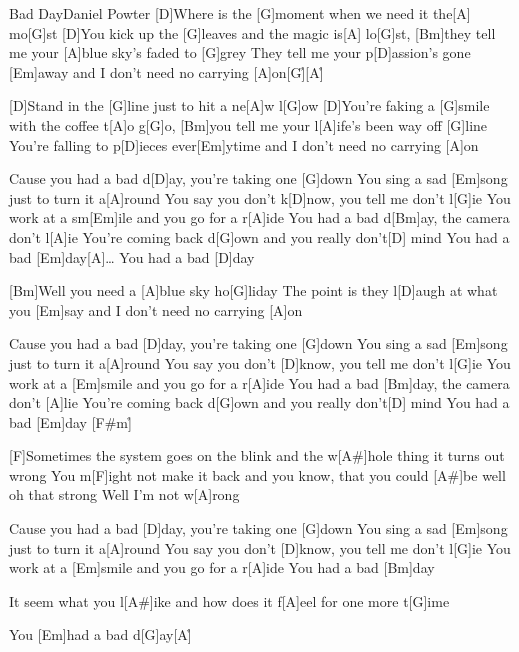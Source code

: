 \documentclass[../main.tex]{subfiles}
\begin{document}
\begin{song}[1]{Bad Day}{Daniel Powter}{}       
[D]Where is the [G]moment when we need it the[A] mo[G]st
[D]You kick up the [G]leaves and the magic is[A] lo[G]st, [Bm]they tell me your [A]blue sky's faded to [G]grey
They tell me your p[D]assion's gone [Em]away and I don't need no carrying [A]on[G]{\h}[A]{\h}

[D]Stand in the [G]line just to hit a ne[A]w l[G]ow
[D]You're faking a [G]smile with the coffee t[A]o g[G]o, [Bm]you tell me your l[A]ife's been way off [G]line
You're falling to p[D]ieces ever[Em]ytime and I don't need no carrying [A]on

Cause you had a bad d[D]ay, you're taking one [G]down
You sing a sad [Em]song just to turn it a[A]round
You say you don't k[D]now, you tell me don't l[G]ie
You work at a sm[Em]ile and you go for a r[A]ide
You had a bad d[Bm]ay, the camera don't l[A]ie
You're coming back d[G]own and you really don't[D] mind
You had a bad [Em]day[A]{…} You had a bad [D]day

[Bm]Well you need a [A]blue sky ho[G]liday
The point is they l[D]augh at what you [Em]say and I don't need no carrying [A]on

Cause you had a bad [D]day, you're taking one [G]down
You sing a sad [Em]song just to turn it a[A]round
You say you don't [D]know, you tell me don't l[G]ie
You work at a [Em]smile and you go for a r[A]ide
You had a bad [Bm]day, the camera don't [A]lie
You're coming back d[G]own and you really don't[D] mind
You had a bad [Em]day [F#m]{\h} 

[F]Sometimes the system goes on the blink and the w[A#]hole thing it turns out wrong
You m[F]ight not make it back and you know, that you could [A#]be well oh that strong
Well I'm not w[A]rong

Cause you had a bad [D]day, you're taking one [G]down
You sing a sad [Em]song just to turn it a[A]round
You say you don't [D]know, you tell me don't l[G]ie
You work at a [Em]smile and you go for a r[A]ide
You had a bad [Bm]day

It seem what you l[A#]ike and how does it f[A]eel for one more t[G]ime

You [Em]had a bad d[G]ay[A]{\h}
\end{song}
\end{document}
